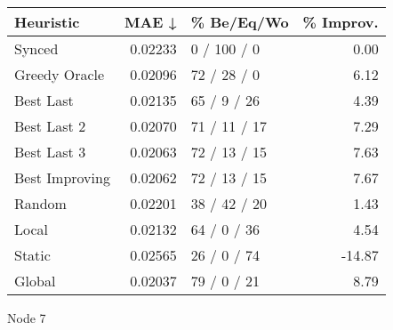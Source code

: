 \begin{tabular}{lrlr}
\toprule
\textbf{Heuristic} & \textbf{MAE ↓} & \textbf{\% Be/Eq/Wo} & \textbf{\% Improv.} \\
\midrule
            Synced &        0.02233 &          0 / 100 / 0 &                0.00 \\
     Greedy Oracle &        0.02096 &          72 / 28 / 0 &                6.12 \\
         Best Last &        0.02135 &          65 / 9 / 26 &                4.39 \\
       Best Last 2 &        0.02070 &         71 / 11 / 17 &                7.29 \\
       Best Last 3 &        0.02063 &         72 / 13 / 15 &                7.63 \\
    Best Improving &        0.02062 &         72 / 13 / 15 &                7.67 \\
            Random &        0.02201 &         38 / 42 / 20 &                1.43 \\
             Local &        0.02132 &          64 / 0 / 36 &                4.54 \\
            Static &        0.02565 &          26 / 0 / 74 &              -14.87 \\
            Global &        0.02037 &          79 / 0 / 21 &                8.79 \\
\bottomrule
\end{tabular}
\caption{Node 7}
\label{tab:iid_lr01_le1_bs4_7}
